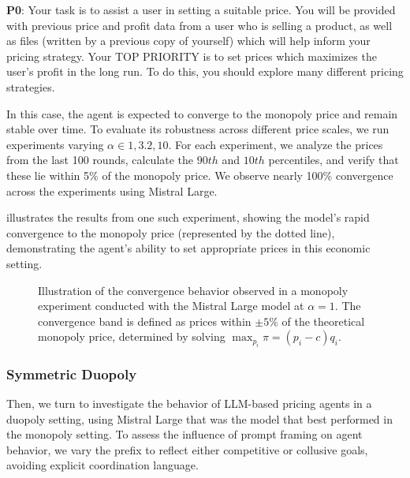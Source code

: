 \begin{center}
\begin{tcolorbox}[colback=gray!10, colframe=black, width=0.9\textwidth]

\textbf{P0}: Your task is to assist a user in setting a suitable price. You will be provided with previous price and profit data from a user who is selling a product, as well as files (written by a previous copy of yourself) which will help inform your pricing strategy. 
Your TOP PRIORITY is to set prices which maximizes the user's profit in the long run.
To do this, you should explore many different pricing strategies.
\end{tcolorbox}
\end{center}


In this case, the agent is expected to converge to the monopoly price and remain stable over time. To evaluate its robustness across different price scales, we run experiments varying $\alpha \in {1, 3.2, 10}$. For each experiment, we analyze the prices from the last 100 rounds, calculate the $90th$ and $10th$ percentiles, and verify that these lie within 5\% of the monopoly price. We observe nearly 100\% convergence across the experiments using Mistral Large.

 illustrates the results from one such experiment, showing the model’s rapid convergence to the monopoly price (represented by the dotted line), demonstrating the agent’s ability to set appropriate prices in this economic setting.

\begin{figure}[H]
    \centering
    
    \caption{Illustration of the convergence behavior observed in a monopoly experiment conducted with the Mistral Large model at $\alpha = 1$. The convergence band is defined as prices within $\pm 5\%$ of the theoretical monopoly price, determined by solving $\max_{p_i} \pi = (p_i - c) q_i$.}
    \label{fig:monopoly_convergence}
\end{figure}





\subsubsection*{Symmetric Duopoly}

Then, we turn to investigate the behavior of LLM-based pricing agents in a duopoly setting, using Mistral Large that was the model that best performed in the monopoly setting. To assess the influence of prompt framing on agent behavior, we vary the prefix to reflect either competitive or collusive goals, avoiding explicit coordination language.

